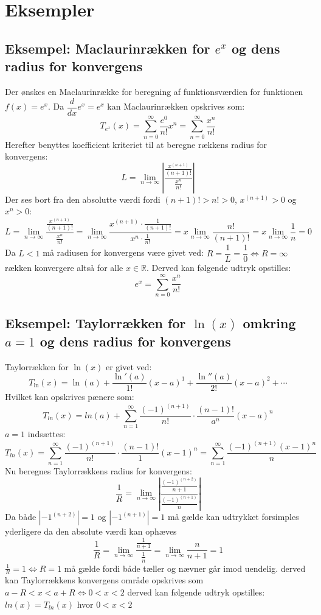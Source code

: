 \section{Eksempler}
\subsection*{\textbf{Eksempel:} Maclaurinrækken for $e^x$ og dens radius for konvergens} 
Der ønskes en Maclaurinrække for beregning af funktionsværdien for funktionen $f(x) = e^x$.
Da $\dfrac{d}{dx}e^x = e^x$ kan Maclaurinrækken opskrives som:
\[
    T_{e^x}(x) = \sum^\infty_{n = 0} \frac{e^0}{n!}x^n = \sum^\infty_{n = 0} \frac{x^n}{n!}
\]
Herefter benyttes koefficient kriteriet til at beregne rækkens radius for konvergens:
\[
    L = \lim_{n \rightarrow \infty} \left\lvert \frac{\frac{x^{(n+1)}}{(n+1)!}}{\frac{x^n}{n!}} \right\lvert
\]
Der ses bort fra den absolutte værdi fordi $(n + 1)! > n! > 0$, $x^{(n+1)} > 0$ og $x^{n} > 0$:
\[
    L = \lim_{n \rightarrow \infty} \frac{\frac{x^{(n+1)}}{(n+1)!}}{\frac{x^n}{n!}} = \lim_{n \rightarrow \infty} \frac{x^{(n+1)} \cdot \frac{1}{(n+1)!}}{x^n \cdot \frac{1}{n!}} = x \lim_{n \rightarrow \infty} \frac{n!}{(n+1)!} = x \lim_{n \rightarrow \infty} \frac{1}{n} = 0
\]
Da $L < 1$ må radiusen for konvergens være givet ved: $R = \dfrac{1}{L} = \dfrac{1}{0} \Leftrightarrow R = \infty$
rækken konvergere altså for alle $x \in \mathbb{R}$. Derved kan følgende udtryk opstilles:
\[
    e^x = \sum^\infty_{n = 0} \frac{x^n}{n!}  
\]
\subsection*{\textbf{Eksempel:} Taylorrækken for $\ln(x)$ omkring $a = 1$ og dens radius for konvergens} %
Taylorrækken for $\ln(x)$ er givet ved: %
\[
    T_{\ln}(x) = \ln(a) + \frac{\ln'(a)}{1!}(x-a)^1 + \frac{\ln''(a)}{2!}(x-a)^2 + \cdots
\]
Hvilket kan opskrives pænere som:
\[
    T_{ln}(x) = ln(a) + \sum^{\infty}_{n = 1} \frac{(-1)^{(n+1)}}{n!} \cdot \frac{(n-1)!}{a^n} (x-a)^{n}
\]
$a = 1$ indsættes:
\[
    T_{ln}(x) = \sum^{\infty}_{n = 1} \frac{(-1)^{(n+1)}}{n!} \cdot \frac{(n-1)!}{1} (x-1)^{n}
    = \sum^{\infty}_{n = 1} \frac{(-1)^{(n+1)}(x-1)^{n}}{n}
\]
Nu beregnes Taylorrækkens radius for konvergens: 
\[
    \frac{1}{R} = \lim_{n \rightarrow \infty} \left\lvert \frac{\frac{(-1)^{(n+2)}}{n+1}}{\frac{(-1)^{(n+1)}}{n}} \right\lvert
\]
Da både $\left\lvert -1^{(n+2)} \right\lvert = 1$ og $\left\lvert-1^{(n + 1)} \right\lvert = 1$ må gælde kan udtrykket forsimples yderligere da den absolute værdi kan ophæves
\[
    \frac{1}{R} = \lim_{n \rightarrow \infty} \frac{\frac{1}{n+1}}{\frac{1}{n}} = \lim_{n \rightarrow \infty} \frac{n}{n+1} = 1
\]
$\frac{1}{R} = 1 \Leftrightarrow R = 1$ må gælde fordi både tæller og nævner går imod uendelig. 
derved kan Taylorrækkens konvergens område opskrives som $a-R < x < a+R \Leftrightarrow 0 < x < 2$ 
derved kan følgende udtryk opstilles: $ln(x) = T_{ln}(x)$ hvor $ 0 < x < 2$